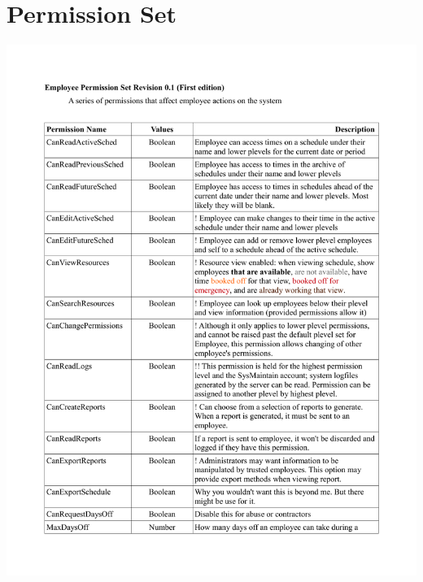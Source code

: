 \documentclass[letterpaper,12pt]{report}
\begin{document}
\section{Permission Set}
\includegraphics[scale=0.8, trim=10mm 0mm 0mm 0mm]{externals/PermissionTable1.pdf}
\newpage
\end{document}

